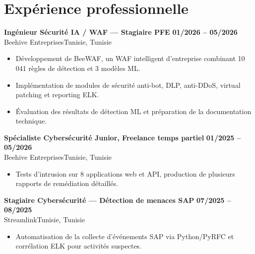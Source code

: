 \documentclass[a4paper,10pt]{article}
\newcommand{\cventry}[4]{\textbf{#1} \hfill \textbf{#4}\\[1pt]#2{\ifx\relax#3\relax\else, #3\fi}\par\vspace{2pt}}
\begin{document}
\section{Expérience professionnelle}
\cventry{Ingénieur Sécurité IA / WAF --- Stagiaire PFE}{Beehive Entreprises}{Tunisie}{01/2026 -- 05/2026}
\begin{itemize}
  \item Développement de BeeWAF, un WAF intelligent d'entreprise combinant 10 041 règles de détection et 3 modèles ML.
  \item Implémentation de modules de sécurité anti-bot, DLP, anti-DDoS, virtual patching et reporting ELK.
  \item Évaluation des résultats de détection ML et préparation de la documentation technique.
\end{itemize}
\cventry{Spécialiste Cybersécurité Junior, Freelance temps partiel}{Beehive Entreprises}{Tunisie}{01/2025 -- 05/2026}
\begin{itemize}
  \item Tests d'intrusion sur 8 applications web et API, production de plusieurs rapports de remédiation détaillés.
\end{itemize}
\cventry{Stagiaire Cybersécurité — Détection de menaces SAP}{Streamlink}{Tunisie}{07/2025 -- 08/2025}
\begin{itemize}
  \item Automatisation de la collecte d'événements SAP via Python/PyRFC et corrélation ELK pour activités suspectes.
\end{itemize}
\end{document}
